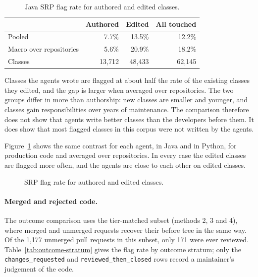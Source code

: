 \begin{table}[htb]
\centering
\caption{Java SRP flag rate for authored and edited classes.}
\label{tab:authored-edited}
\begin{tabular}{@{}lrrr@{}}
\toprule
 & \textbf{Authored} & \textbf{Edited} & \textbf{All touched} \\
\midrule
Pooled  & 7.7\% & 13.5\% & 12.2\% \\
Macro over repositories & 5.6\% & 20.9\% & 18.2\% \\
Classes & 13{,}712 & 48{,}433 & 62{,}145 \\
\bottomrule
\end{tabular}
\end{table}

Classes the agents wrote are flagged at about half the rate of the existing classes they edited, and
the gap is larger when averaged over repositories. The two groups differ in more than authorship: new
classes are smaller and younger, and classes gain responsibilities over years of maintenance. The
comparison therefore does not show that agents write better classes than the developers before
them. It does show that most flagged classes in this corpus were not written by the agents.

Figure~\ref{fig:srp-agents} shows the same contrast for each agent, in Java and in Python, for
production code and averaged over repositories. In every case the edited classes are flagged more
often, and the agents are close to each other on edited classes.

\begin{figure}[htb]
\centering

\caption{SRP flag rate for authored and edited classes.}
\label{fig:srp-agents}
\end{figure}

\paragraph{Merged and rejected code.} The outcome comparison uses the tier-matched subset (methods 2,
3 and 4), where merged and unmerged requests recover their before tree in the same way. Of the
1{,}177 unmerged pull requests in this subset, only 171 were ever reviewed. Table~\ref{tab:outcome-stratum}
gives the flag rate by outcome stratum; only the \texttt{changes\_requested} and
\texttt{reviewed\_then\_closed} rows record a maintainer's judgement of the code.

